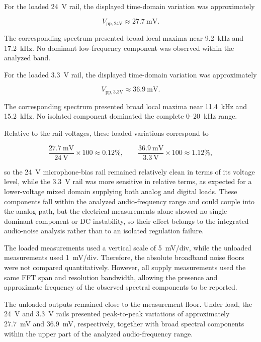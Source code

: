 For the loaded 24~V rail, the displayed time-domain variation was approximately

\begin{equation}
    V_{\mathrm{pp},24\mathrm{V}}
    \approx 27.7~\mathrm{mV}.
\end{equation}

The corresponding spectrum presented broad local maxima near 9.2~kHz and 17.2~kHz. No dominant low-frequency component was observed within the analyzed band.

For the loaded 3.3~V rail, the displayed time-domain variation was approximately

\begin{equation}
    V_{\mathrm{pp},3.3\mathrm{V}}
    \approx 36.9~\mathrm{mV}.
\end{equation}

The corresponding spectrum presented broad local maxima near 11.4~kHz and 15.2~kHz. No isolated component dominated the complete 0--20~kHz range.

Relative to the rail voltages, these loaded variations correspond to

\begin{equation}
\frac{27.7~\mathrm{mV}}{24~\mathrm{V}}\times 100 \approx 0.12\%, \qquad
\frac{36.9~\mathrm{mV}}{3.3~\mathrm{V}}\times 100 \approx 1.12\%,
\end{equation}

so the 24~V microphone-bias rail remained relatively clean in terms of its voltage level, while the 3.3~V rail was more sensitive in relative terms, as expected for a lower-voltage mixed domain supplying both analog and digital loads. These components fall within the analyzed audio-frequency range and could couple into the analog path, but the electrical measurements alone showed no single dominant component or DC instability, so their effect belongs to the integrated audio-noise analysis rather than to an isolated regulation failure.

The loaded measurements used a vertical scale of 5~mV/div, while the unloaded measurements used 1~mV/div. Therefore, the absolute broadband noise floors were not compared quantitatively. However, all supply measurements used the same FFT span and resolution bandwidth, allowing the presence and approximate frequency of the observed spectral components to be reported.

The unloaded outputs remained close to the measurement floor. Under load, the 24~V and 3.3~V rails presented peak-to-peak variations of approximately 27.7~mV and 36.9~mV, respectively, together with broad spectral components within the upper part of the analyzed audio-frequency range.


